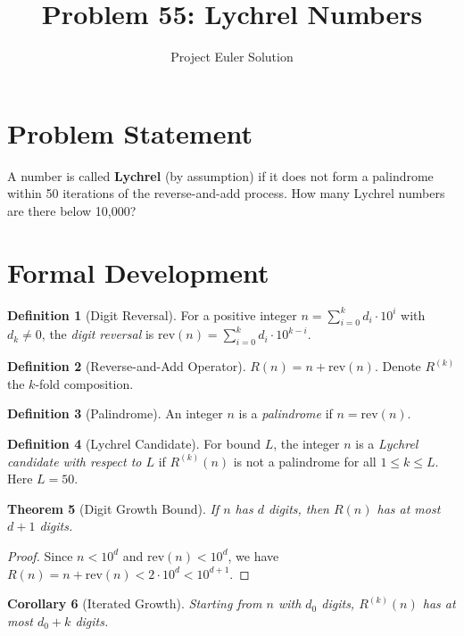 \documentclass[12pt]{article}
\title{Problem 55: Lychrel Numbers}
\author{Project Euler Solution}
\date{}
\newtheorem{theorem}{Theorem}
\newtheorem{corollary}[theorem]{Corollary}
\theoremstyle{definition}
\newtheorem{definition}[theorem]{Definition}
\theoremstyle{remark}
\begin{document}
\maketitle

\section{Problem Statement}
A number is called \textbf{Lychrel} (by assumption) if it does not form a palindrome within 50 iterations of the reverse-and-add process. How many Lychrel numbers are there below 10{,}000?

\section{Formal Development}

\begin{definition}[Digit Reversal]
For a positive integer $n = \sum_{i=0}^{k} d_i \cdot 10^i$ with $d_k \neq 0$, the \emph{digit reversal} is $\mathrm{rev}(n) = \sum_{i=0}^{k} d_i \cdot 10^{k-i}$.
\end{definition}

\begin{definition}[Reverse-and-Add Operator]
$R(n) = n + \mathrm{rev}(n)$. Denote $R^{(k)}$ the $k$-fold composition.
\end{definition}

\begin{definition}[Palindrome]
An integer $n$ is a \emph{palindrome} if $n = \mathrm{rev}(n)$.
\end{definition}

\begin{definition}[Lychrel Candidate]
For bound $L$, the integer $n$ is a \emph{Lychrel candidate with respect to $L$} if $R^{(k)}(n)$ is not a palindrome for all $1 \leq k \leq L$. Here $L = 50$.
\end{definition}

\begin{theorem}[Digit Growth Bound]
\label{thm:growth}
If $n$ has $d$ digits, then $R(n)$ has at most $d + 1$ digits.
\end{theorem}

\begin{proof}
Since $n < 10^d$ and $\mathrm{rev}(n) < 10^d$, we have $R(n) = n + \mathrm{rev}(n) < 2 \cdot 10^d < 10^{d+1}$.
\end{proof}

\begin{corollary}[Iterated Growth]
Starting from $n$ with $d_0$ digits, $R^{(k)}(n)$ has at most $d_0 + k$ digits.
\end{corollary}
\end{document}
